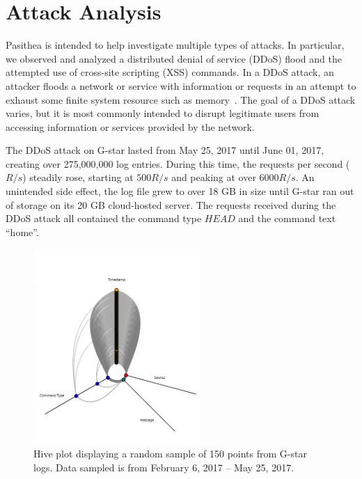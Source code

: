 
\section{Attack Analysis} \label{analysis}

Pasithea is intended to help investigate multiple types of attacks.
In particular, we observed and analyzed a distributed denial of service (DDoS) flood and the attempted use of cross-site scripting (XSS) commands.
In a DDoS attack, an attacker floods a network or service with information or requests in an attempt to exhaust some finite system resource such as memory~\cite{DoS-Def}. 
The goal of a DDoS attack varies, but it is most commonly intended to disrupt legitimate users from accessing information or services provided by the network.

The DDoS attack on G-star lasted from May 25, 2017 until June 01, 2017, creating over 275,000,000 log entries. 
During this time, the requests per second ($R/s$) steadily rose, starting at $500 R/s$ and peaking at over $6000 R/s$. 
An unintended side effect, the log file grew to over 18 GB in size until G-star ran out of storage on its 20 GB cloud-hosted server.
The requests received during the DDoS attack all contained the command type $HEAD$ and the command text ``home''.

\begin{figure}[b]
   \centering
   \includegraphics[width=2.5in]{images/regHive.png} 
   \caption{Hive plot displaying a random sample of 150 points from G-star logs. Data sampled is from February 6, 2017 -- May 25, 2017.}
   \label{fig:regHive}
\end{figure}

